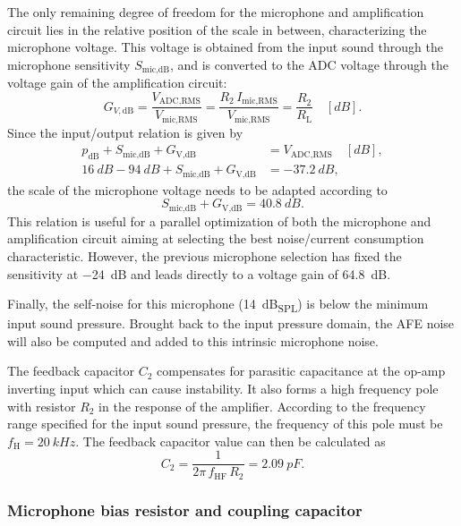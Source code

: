 \documentclass{EPL-master-thesis-covers-EN}
\newcommand{\te}[1]{\textrm{#1}}
\begin{document}
The only remaining degree of freedom for the microphone and amplification circuit lies in the relative position of the scale in between, characterizing the microphone voltage. This voltage is obtained from the input sound through the microphone sensitivity $S_{\te{mic,dB}}$, and is converted to the ADC voltage through the voltage gain of the amplification circuit:
\[
 G_{V,\te{dB}} = \frac{V_\te{ADC,RMS}}{V_\te{mic,RMS}} = \frac{R_2 \, I_\te{mic,RMS}}{V_\te{mic,RMS}} = \frac{R_2}{R_\te{L}} \quad \si{[dB]}.
\]
Since the input/output relation is given by
\begin{align*}
  p_\te{dB} + S_{\te{mic,dB}} + G_{\te{V,dB}} &= V_\te{ADC,RMS} \quad \si{[dB]},\\
  \SI{16}{dB} - \SI{94}{dB} + S_{\te{mic,dB}} + G_{\te{V,dB}} &= 
  \SI{-37.2}{dB},
\end{align*}
the scale of the microphone voltage needs to be adapted according to
\[
 S_{\te{mic,dB}} + G_{\te{V,dB}} = \SI{40.8}{dB}.
\]
This relation is useful for a parallel optimization of both the microphone and amplification circuit aiming at selecting the best noise/current consumption characteristic. However, the previous microphone selection has fixed the sensitivity at \SI{-24}{dB} and leads directly to a voltage gain of \SI{64.8}{dB}.

Finally, the self-noise for this microphone (\SI{14}{dB_{SPL}}) is below the minimum input sound pressure. Brought back to the input pressure domain, the AFE noise will also be computed and added to this intrinsic microphone noise.

The feedback capacitor $C_2$ compensates for parasitic capacitance at the op-amp inverting input which can cause instability. It also forms a high frequency pole with resistor $R_2$ in the response of the amplifier. According to the frequency range specified for the input sound pressure, the frequency of this pole must be $f_\te{H} = \SI{20}{kHz}$. The feedback capacitor value can then be calculated as
\[
 C_2 = \frac{1}{2 \pi \, f_\te{HF} \, R_2} = \SI{2.09}{pF}.
\]

\subsubsection*{Microphone bias resistor and coupling capacitor}
\end{document}
